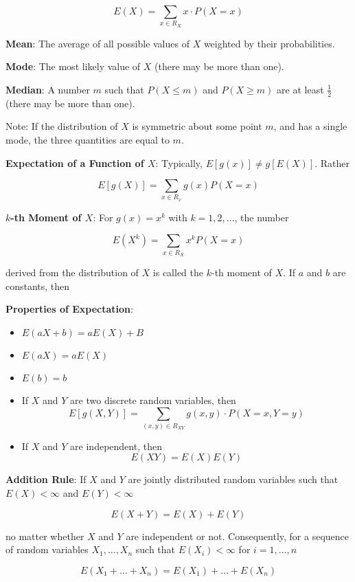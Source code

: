 \documentclass{article}
\begin{document}
$$E(X)=\underset{x\in R_X}{\sum}x\cdot P(X=x)$$

\noindent\textbf{\color{blue}Mean}: The average of all possible values of $X$ weighted by their probabilities.

\noindent\textbf{\color{blue}Mode}: The most likely value of $X$ (there may be more than one).

\noindent\textbf{\color{blue}Median}: A number $m$ such that $P(X\le m)$ and $P(X\ge m)$ are at least $\frac{1}{2}$ (there may be more than one).

Note: If the distribution of $X$ is symmetric about some point $m$, and has a single mode, the three quantities are equal to $m$.

\noindent\textbf{\color{orange}Expectation of a Function of $X$}: Typically, $E[g(x)]\ne g[E(X)]$. Rather

$$E[g(X)]=\underset{x\in R_x}{\sum}g(x)P(X=x)$$

\noindent\textbf{\color{blue}$k$-th Moment of $X$}: For $g(x)=x^k$ with $k=1,2,\ldots$, the number

$$E(X^k)=\underset{x\in R_X}{\sum}x^kP(X=x)$$

derived from the distribution of $X$ is called the $k$-th moment of $X$.
If $a$ and $b$ are constants, then

\noindent\textbf{\color{red}Properties of Expectation}:

\begin{itemize}
    \item $E(aX+b)=aE(X)+B$
    \item $E(aX)=aE(X)$
    \item $E(b)=b$
    \item If $X$ and $Y$ are two discrete random variables, then
$$E[g(X,Y)]=\underset{(x,y)\in R_{XY}}{\sum}g(x,y)\cdot P(X=x,Y=y)$$
    \item If $X$ and $Y$ are independent, then
$$E(XY)=E(X)E(Y)$$
\end{itemize}

\noindent\textbf{\color{red}Addition Rule}: If $X$ and $Y$ are jointly distributed random variables such that $E(X)<\infty$ and $E(Y)<\infty$

$$E(X+Y)=E(X)+E(Y)$$

no matter whether $X$ and $Y$ are independent or not. Consequently, for a sequence of random variables $X_1,\ldots,X_n$ such that $E(X_i)<\infty$ for $i=1,\ldots,n$

$$E(X_1+\ldots+X_n)=E(X_1)+\ldots+E(X_n)$$
\end{document}
